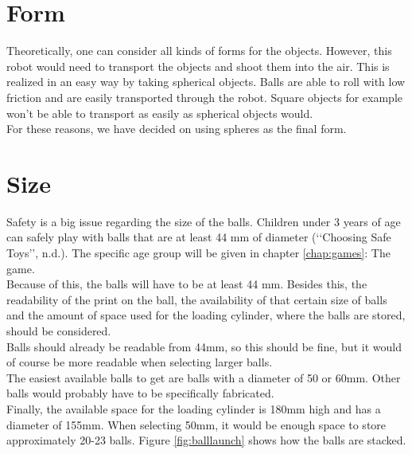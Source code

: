 \documentclass[11pt,twoside,a4paper]{report}
\begin{document}
\section*{Form}
Theoretically, one can consider all kinds of forms for the objects. However, this robot would need to transport the objects and shoot them into the air. This is realized in an easy way by taking spherical objects. Balls are able to roll with low friction and are easily transported through the robot. Square objects for example won\rq{}t be able to transport as easily as spherical objects would. \\
For these reasons, we have decided on using spheres as the final form.

\section*{Size}
Safety is a big issue regarding the size of the balls. Children under 3 years of age can safely play with balls that are at least 44 mm of diameter (\lq\lq{}Choosing Safe Toys\rq\rq{}, n.d.). The specific age group will be given in chapter \ref{chap:games}: The game. \\
Because of this, the balls will have to be at least 44 mm. Besides this, the readability of the print on the ball, the availability of that certain size of balls and the amount of space used for the loading cylinder, where the balls are stored, should be considered. \\
Balls should already be readable from 44mm, so this should be fine, but it would of course be more readable when selecting larger balls. \\
The easiest available balls to get are balls with a diameter of 50 or 60mm. Other balls would probably have to be specifically fabricated. \\
Finally, the available space for the loading cylinder is 180mm high and has a diameter of 155mm. When selecting 50mm, it would be enough space to store approximately 20-23 balls. Figure \ref{fig:balllaunch} shows how the balls are stacked. \\
\end{document}
